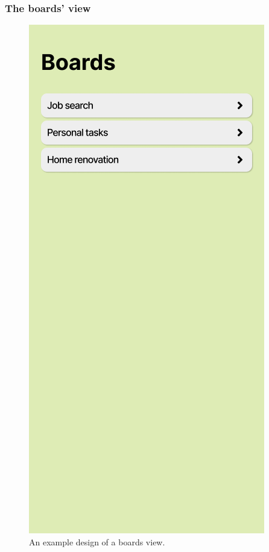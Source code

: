 \subsubsection{The boards' view}

\begin{figure}
    \centering
    \begin{minipage}{0.45\textwidth}
        \centering
        \includegraphics[height=0.4\textheight]{./3-research-methodology/boards-view}
        \caption{An example design of a boards view.}
        \label{fig:3-4-boards-view}
    \end{minipage}

\end{figure}
